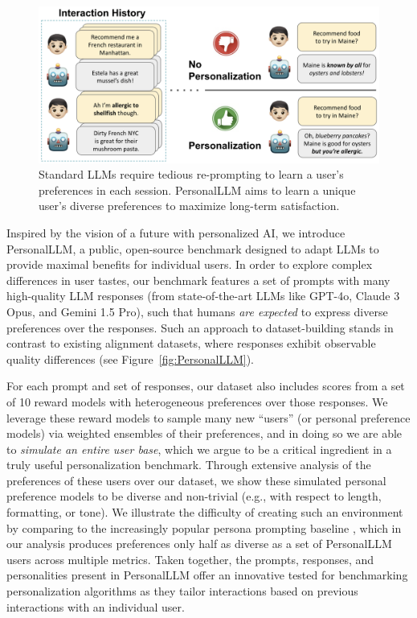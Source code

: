 \begin{figure}[t]
    \centering
    \includegraphics[width=\textwidth]{figures/fig1.png}
    \caption{
    Standard LLMs require tedious re-prompting to learn a user’s preferences in each session. \textsf{PersonalLLM} aims to learn a unique user's diverse preferences to maximize long-term satisfaction.}
    \label{fig:main_figure}
\end{figure}

Inspired by the vision of a future with personalized AI, we introduce \textsf{PersonalLLM}, a public, open-source benchmark designed to adapt LLMs to provide maximal benefits for individual users. In order to explore complex differences in user tastes, our benchmark features a set of prompts with many high-quality LLM responses (from state-of-the-art LLMs like GPT-4o, Claude 3 Opus, and Gemini 1.5 Pro), such that humans \textit{are expected} to express diverse preferences over the responses.
Such an approach to dataset-building stands in contrast to existing alignment datasets, where responses exhibit observable quality differences (see Figure~\ref{fig:PersonalLLM}).

For each prompt and set of responses, our dataset also includes scores from a set of 10 reward models with heterogeneous preferences over those responses.
We leverage these reward models to sample many new ``users'' (or personal preference models) via weighted ensembles of their preferences, and in doing so we are able to \textit{simulate an entire user base}, which we argue to be a critical ingredient in a truly useful personalization benchmark.  
Through extensive analysis of the preferences of these users over our dataset, we show these simulated personal preference models to be diverse and non-trivial (e.g., with respect to length, formatting, or tone). We illustrate the difficulty of creating such an environment by comparing to the increasingly popular persona prompting baseline \citep{castricato2024personareproducibletestbedpluralistic, chan2024scalingsyntheticdatacreation, jang2023personalizedsoupspersonalizedlarge}, which in our analysis produces preferences only half as diverse as a set of \textsf{PersonalLLM} users across multiple metrics.
Taken together, the prompts, responses, and personalities present in \textsf{PersonalLLM} offer an innovative tested for benchmarking personalization algorithms as they tailor interactions based on previous interactions with an individual user.

